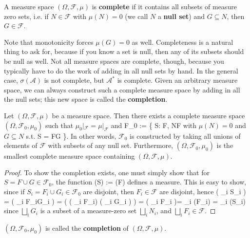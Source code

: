 \begin{definition}[Complete]
	A measure space $(\Omega, \mathcal F, \mu)$ is \textbf{complete} if it contains all subsets of measure zero sets, i.e. if $N\in\mathcal F$ with $\mu(N) = 0$ (we call $N$ a \textbf{null set}) and $G\subseteq N$, then $G\in\mathcal F$. 
\end{definition}

Note that monotonicity forces $\mu(G) = 0$ as well. Completeness is a natural thing to ask for, because if you know a set is null, then any of its subsets should be null as well. Not all measure spaces are complete, though, because you typically have to do the work of adding in all null sets by hand. In the general case, $\sigma(\mathcal A)$ is not complete, but $\mathcal A^*$ is complete. Given an arbitrary measure space, we can always construct such a complete measure space by adding in all the null sets; this new space is called the \textbf{completion}. 

\begin{theorem}
	Let $(\Omega, \mathcal F, \mu)$ be a measure space. Then there exists a complete measure space $(\Omega, \mathcal F_0, \mu_0)$ such that $\mu_0|_{\mathcal F} = \mu|_{\mathcal F}$ and 
	\eq
		\mathcal F_0 := \left\{ S\subseteq\Omega : \exists F, N\in\mathcal F \textnormal{ with $\mu(N) = 0$ and $G\subseteq N$ s.t. } S = F\cup G \right\}.
	\qe
	In other words, $\mathcal F_0$ is constructed by taking all unions of elements of $\mathcal F$ with subsets of any null set. Furthermore, $(\Omega, \mathcal F_0, \mu_0)$ is the smallest complete measure space containing $(\Omega, \mathcal F, \mu)$. 
\end{theorem}

\begin{proof}
To show the completion exists, one must simply show that for $S = F\cup G\in\mathcal F_0$, the function
\eq
	\mu(S) := \mu(F)
\qe
defines a measure. This is easy to show, since if $S_i = F_i\cup G_i\in\mathcal F_0$ are disjoint, then $F_i\in\mathcal F$ are disjoint, hence
\eq
	\mu\left( \bigsqcup_i S_i \right) = \mu\left( \bigsqcup_i F_i\cup G_i \right) = \mu\left( \left( \bigsqcup_i F_i\right) \cup \left( \bigsqcup_i G_i \right) \right) = \mu\left( \bigsqcup_i F_i \right)= \sum_i \mu(F_i) = \sum_i \mu(S_i)
\qe
since $\bigsqcup_i G_i$ is a subset of a measure-zero set $\bigsqcup_i N_i$, and $\bigsqcup_i F_i\in\mathcal F$. 
\end{proof}

\begin{definition}[Completion]
	$(\Omega, \mathcal F_0, \mu_0)$ is called the \textbf{completion} of $(\Omega, \mathcal F, \mu)$. 
\end{definition}

